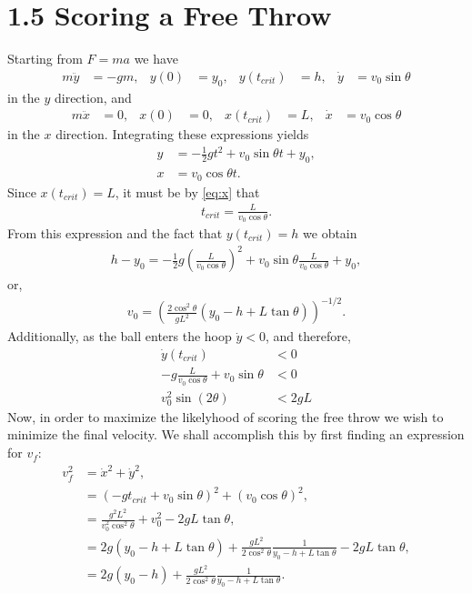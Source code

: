 \documentclass[12pt]{article}
\begin{document}
\section*{1.5 Scoring a Free Throw}
Starting from $F = ma$ we have
\begin{align*}
m \ddot{y} &= -g m, & y(0) &= y_0, & y(t_{crit}) &= h, & \dot{y} &= v_0 \sin \theta
\end{align*}
in the $y$ direction, and
\begin{align*}
m \ddot{x} &= 0, & x(0) &= 0, & x(t_{crit}) &= L, & \dot{x} &= v_0 \cos \theta
\end{align*}
in the $x$ direction. Integrating these expressions yields
\begin{align}
y &= -\frac{1}{2} g t^2 + v_0 \sin \theta t + y_0, \nonumber \\
x &= v_0 \cos \theta t.
\label{eq:x}
\end{align}
Since $x(t_{crit}) = L$, it must be by \eqref{eq:x} that
\begin{align*}
t_{crit} = \frac{L}{v_0 \cos \theta}.
\end{align*}
From this expression and the fact that $y(t_{crit}) = h$ we obtain
\begin{align*}
h - y_0 = -\frac{1}{2} g \left(  \frac{L}{v_0 \cos \theta} \right)^2 + v_0 \sin \theta \frac{L}{v_0 \cos \theta} + y_0,
\end{align*}
or,
\begin{align*}
v_0 = \left( \frac{2 \cos^2 \theta}{g L^2} \left( y_0 - h + L \tan \theta \right) \right)^{-1/2}.
\end{align*}
Additionally, as the ball enters the hoop $\dot{y} < 0$, and therefore,
\begin{align*}
\dot{y}(t_{crit}) &< 0 \\
-g \frac{L}{v_0 \cos \theta} + v_0 \sin \theta &< 0 \\
v_0^2 \sin \left( 2\theta \right) &< 2gL
\end{align*}
Now, in order to maximize the likelyhood of scoring the free throw we wish to minimize the final velocity. We shall accomplish this by first finding an expression for $v_f$:
\begin{align*}
v_f^2 &= \dot{x}^2 + \dot{y}^2, \\
&= \left( -g t_{crit} + v_0 \sin \theta \right)^2 + \left( v_0 \cos \theta \right)^2, \\
&= \frac{g^2 L^2}{v_0^2 \cos^2 \theta} + v_0^2 - 2 g L \tan \theta, \\
&= 2 g \left( y_0 - h + L \tan \theta \right) + \frac{g L^2}{2 \cos^2 \theta} \frac{1}{y_0 - h + L \tan \theta} - 2 g L \tan \theta, \\
&= 2 g \left( y_0 - h \right) + \frac{g L^2}{2 \cos^2 \theta} \frac{1}{y_0 - h + L \tan \theta}.
\end{align*}
\end{document}
